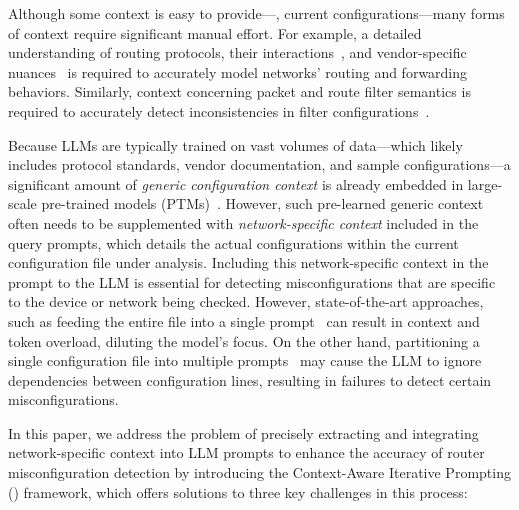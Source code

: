 Although some context is easy to provide---\eg, current
config\-urations---many forms of context require significant manual effort.
For example, a detailed understanding of routing protocols, their
interactions~\cite{le2007rr}, and vendor-specific nuances~\cite{ye2020hoyan}
is required to accurately model networks' routing and forwarding behaviors.
Similarly, context concerning packet and route filter semantics is required to
accurately detect inconsistencies in filter
configurations~\cite{kakarla2020finding}.

Because LLMs are typically trained on vast volumes of data---which likely
includes protocol standards, vendor documentation, and sample
configurations---a significant amount of \textit{generic configuration
context} is already embedded in large-scale pre-trained models
(PTMs)~\cite{qiu2020pre}. However, such pre-learned generic context often
needs to be supplemented with \textit{network-specific context} included in the query prompts, which details
the actual configurations within the current configuration file under
analysis. 
Including this network-specific context in the prompt to the LLM is essential
for detecting misconfigurations that are specific to the device or network
being checked.
However, state-of-the-art 
approaches, such as feeding the entire file into a single
prompt~\cite{lican,li2024long} can result in context and token overload,
diluting the model's focus. On the other hand, partitioning a single
configuration file into multiple
prompts~\cite{lian2023configuration,chen2024automatic,wang2024identifying}
may cause the LLM to ignore dependencies between configuration lines,
resulting in failures to detect certain misconfigurations.


In this paper, we address the problem of precisely extracting and integrating network-specific context into LLM prompts to enhance the accuracy of router misconfiguration detection by introducing the
Context-Aware Iterative Prompting (\sysname{}) framework, which
offers solutions to three key challenges in this process:

